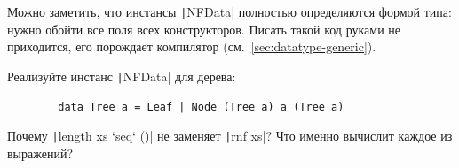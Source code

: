 Можно заметить, что инстансы \texttt|NFData| полностью определяются формой типа: нужно обойти все поля всех конструкторов.
Писать такой код руками не приходится, его порождает компилятор (см.~\ref{sec:datatype-generic}).

\begin{task}
    Реализуйте инстанс \texttt|NFData| для дерева:
    \begin{verbatim}
        data Tree a = Leaf | Node (Tree a) a (Tree a)
    \end{verbatim}
\end{task}

\begin{task}
    Почему \texttt|length xs `seq` ()| не заменяет \texttt|rnf xs|?
    Что именно вычислит каждое из выражений?
\end{task}
